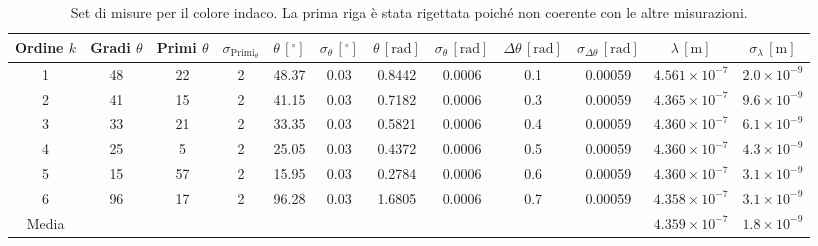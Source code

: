 \documentclass[a4paper,12pt]{article}
\begin{document}
\begin{table}[H]
\centering
\begin{tabular}{|c|c|c|c|c|c|c|c|c|c|c|c|}
\hline
Ordine \(k\) & Gradi \(\theta\) & Primi \(\theta\) & \(\sigma_{\text{Primi}_\theta}\) & \(\theta \, [^\circ]\) & \(\sigma_\theta \, [^\circ]\) & \(\theta \, [\text{rad}]\) & \(\sigma_\theta \, [\text{rad}]\) & \(\Delta \theta \, [\text{rad}]\) & \(\sigma_{\Delta \theta} \, [\text{rad}]\) & \(\lambda \, [\text{m}]\) & \(\sigma_\lambda \, [\text{m}]\) \\ 
\hline
1 & 48 & 22 & 2 & 48.37 & 0.03 & 0.8442 & 0.0006 & 0.1 & 0.00059 & \(4.561 \times 10^{-7}\) & \(2.0 \times 10^{-9}\) \\ 
2 & 41 & 15 & 2 & 41.15 & 0.03 & 0.7182 & 0.0006 & 0.3 & 0.00059 & \(4.365 \times 10^{-7}\) & \(9.6 \times 10^{-9}\) \\ 
3 & 33 & 21 & 2 & 33.35 & 0.03 & 0.5821 & 0.0006 & 0.4 & 0.00059 & \(4.360 \times 10^{-7}\) & \(6.1 \times 10^{-9}\) \\ 
4 & 25 & 5 & 2 & 25.05 & 0.03 & 0.4372 & 0.0006 & 0.5 & 0.00059 & \(4.360 \times 10^{-7}\) & \(4.3 \times 10^{-9}\) \\ 
5 & 15 & 57 & 2 & 15.95 & 0.03 & 0.2784 & 0.0006 & 0.6 & 0.00059 & \(4.360 \times 10^{-7}\) & \(3.1 \times 10^{-9}\) \\ 
6 & 96 & 17 & 2 & 96.28 & 0.03 & 1.6805 & 0.0006 & 0.7 & 0.00059 & \(4.358 \times 10^{-7}\) & \(3.1 \times 10^{-9}\) \\ 
\hline
Media & & & & & & & & & & \(4.359 \times 10^{-7}\) & \(1.8 \times 10^{-9}\) \\ 
\hline
\end{tabular}
\caption{Set di misure per il colore indaco. La prima riga è stata rigettata poiché non coerente con le altre misurazioni.}
\end{table}
\end{document}
